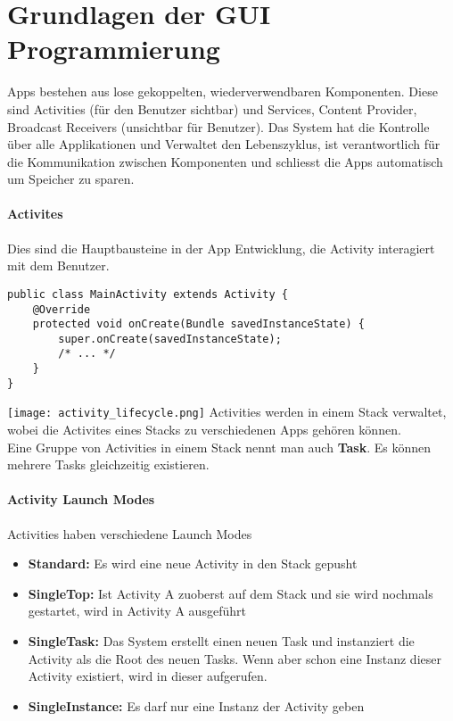 \section{Grundlagen der GUI Programmierung}
Apps bestehen aus lose gekoppelten, wiederverwendbaren Komponenten. Diese sind Activities (für den Benutzer sichtbar) und Services, Content Provider, Broadcast Receivers (unsichtbar für Benutzer). Das System hat die Kontrolle über alle Applikationen und Verwaltet den Lebenszyklus, ist verantwortlich für die Kommunikation zwischen Komponenten und schliesst die Apps automatisch um Speicher zu sparen.
\paragraph{Activites} Dies sind die Hauptbausteine in der App Entwicklung, die Activity interagiert mit dem Benutzer.
\begin{lstlisting}
public class MainActivity extends Activity {
    @Override
    protected void onCreate(Bundle savedInstanceState) {
        super.onCreate(savedInstanceState);
        /* ... */
    }
}
\end{lstlisting}
\texttt{[image: activity\_lifecycle.png]}
Activities werden in einem Stack verwaltet, wobei die Activites eines Stacks zu verschiedenen Apps gehören können.\\
Eine Gruppe von Activities in einem Stack nennt man auch \textbf{Task}. Es können mehrere Tasks gleichzeitig existieren. 
\paragraph{Activity Launch Modes} Activities haben verschiedene Launch Modes
\begin{itemize}
\item \textbf{Standard:} Es wird eine neue Activity in den Stack gepusht
\item \textbf{SingleTop:} Ist Activity A zuoberst auf dem Stack und sie wird nochmals gestartet, wird in Activity A  ausgeführt
\item \textbf{SingleTask:} Das System erstellt einen neuen Task und instanziert die Activity als die Root des neuen Tasks. Wenn aber schon eine Instanz dieser Activity existiert, wird  in dieser aufgerufen. 
\item \textbf{SingleInstance:} Es darf nur eine Instanz der Activity geben
\end{itemize}
